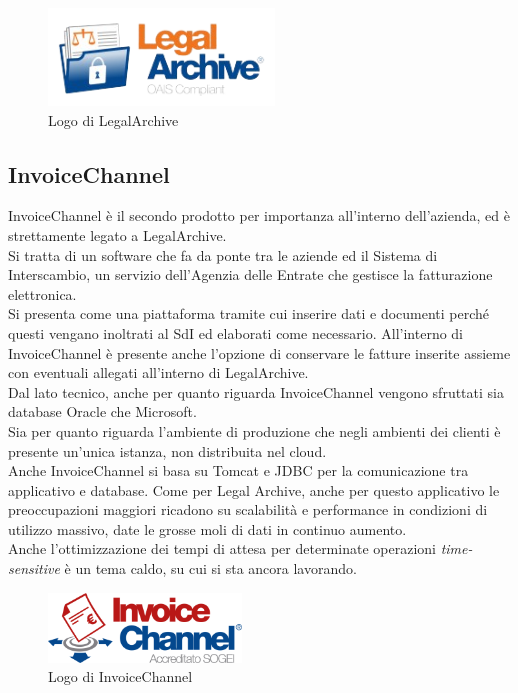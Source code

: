 \begin{figure}[htbp]
\begin{center}
\includegraphics[height=7em]{immagini/tecnologies-logos/logo-legal-archive.png}
\caption{Logo di LegalArchive}
\end{center}
\end{figure}

\subsection{InvoiceChannel}
InvoiceChannel è il secondo prodotto per importanza all'interno dell'azienda, ed è strettamente legato a LegalArchive.\\
Si tratta di un software che fa da ponte tra le aziende ed il Sistema di Interscambio, un servizio dell'Agenzia delle Entrate che gestisce la fatturazione elettronica.\\
Si presenta come una piattaforma tramite cui inserire dati e documenti perché questi vengano inoltrati al SdI ed elaborati come necessario. All'interno di InvoiceChannel è presente anche l'opzione di conservare le fatture inserite assieme con eventuali allegati all'interno di LegalArchive.\\
Dal lato tecnico, anche per quanto riguarda InvoiceChannel vengono sfruttati sia database Oracle che Microsoft.\\
Sia per quanto riguarda l'ambiente di produzione che negli ambienti dei clienti è presente un'unica istanza, non distribuita nel cloud.\\
Anche InvoiceChannel si basa su \gls{Tomcat} e \gls{JDBC} per la comunicazione tra applicativo e database.
Come per Legal Archive, anche per questo applicativo le preoccupazioni maggiori ricadono su scalabilità e performance in condizioni di utilizzo massivo, date le grosse moli di dati in continuo aumento.\\
Anche l'ottimizzazione dei tempi di attesa per determinate operazioni \textit{time-sensitive} è un tema caldo, su cui si sta ancora lavorando.\\

\begin{figure}[htbp]
\begin{center}
\includegraphics[height=5em]{immagini/tecnologies-logos/logo-invoice-channel.png}
\caption{Logo di InvoiceChannel}
\end{center}
\end{figure}

